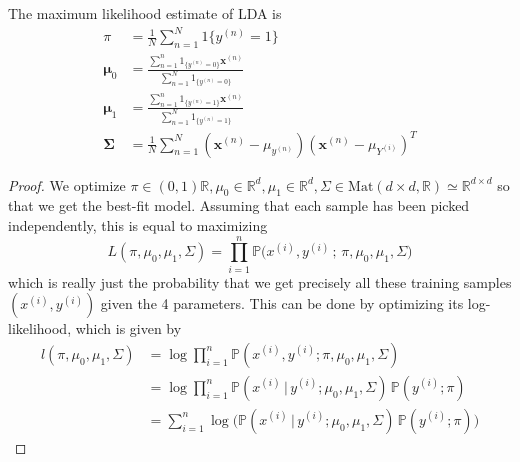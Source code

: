   \begin{theorem}[MLE]
    The maximum likelihood estimate of LDA is 
    \begin{align}
      \pi & = \frac{1}{N} \sum_{n=1}^N 1\{y^{(n)} = 1\} \\
      \boldsymbol{\mu}_0 & = \frac{\sum_{n=1}^n 1_{\{y^{(n)} = 0 \}} \mathbf{x}^{(n)}}{\sum_{n=1}^N 1_{\{y^{(n)} = 0 \}}} \\
      \boldsymbol{\mu}_1 & = \frac{\sum_{n=1}^n 1_{\{y^{(n)} = 1\}} \mathbf{x}^{(n)}}{\sum_{n=1}^N 1_{\{y^{(n)} = 1 \}}} \\
      \boldsymbol{\Sigma} & = \frac{1}{N} \sum_{n=1}^N (\mathbf{x}^{(n)} - \mu_{y^{(n)}}) (\mathbf{x}^{(n)} - \mu_{Y^{(i)}})^T 
    \end{align}
  \end{theorem}
  \begin{proof}
    We optimize $\pi \in (0, 1) \mathbb{R}, \mu_0 \in \mathbb{R}^d, \mu_1 \in \mathbb{R}^d, \Sigma \in \text{Mat}(d \times d, \mathbb{R}) \simeq \mathbb{R}^{d \times d}$ so that we get the best-fit model. Assuming that each sample has been picked independently, this is equal to maximizing 
    \begin{equation}
      L(\pi, \mu_0, \mu_1, \Sigma) = \prod_{i=1}^n \mathbb{P}\big( x^{(i)}, y^{(i)}\,;\, \pi, \mu_0, \mu_1, \Sigma\big)
    \end{equation}
    which is really just the probability that we get precisely all these training samples $(x^{(i)}, y^{(i)})$ given the 4 parameters. This can be done by optimizing its log-likelihood, which is given by 
    \begin{align}
      l(\pi, \mu_0, \mu_1, \Sigma) & = \log \prod_{i=1}^n \mathbb{P}(x^{(i)}, y^{(i)}; \pi, \mu_0, \mu_1, \Sigma) \\
      & = \log \prod_{i=1}^n \mathbb{P}( x^{(i)} \,|\, y^{(i)}; \mu_0, \mu_1, \Sigma) \, \mathbb{P}(y^{(i)}; \pi) \\
      & = \sum_{i=1}^n \log \bigg( \mathbb{P}( x^{(i)} \,|\, y^{(i)}; \mu_0, \mu_1, \Sigma) \, \mathbb{P}(y^{(i)}; \pi) \bigg)
    \end{align}
  \end{proof} 

